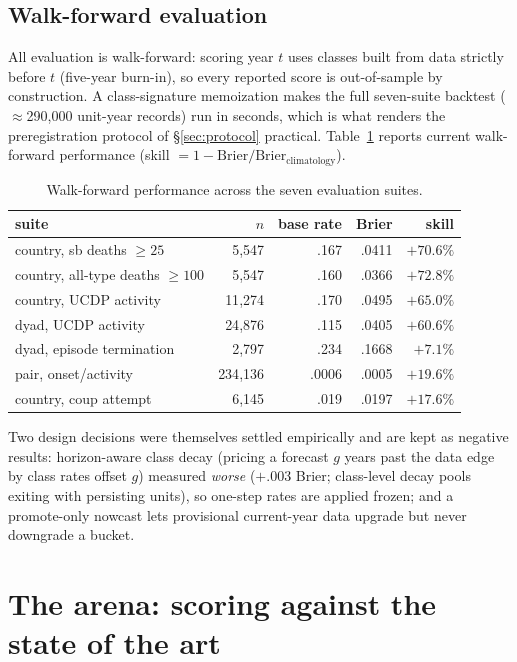\documentclass[11pt]{article}
\newcommand{\brier}{\mathrm{Brier}}
\begin{document}
\subsection{Walk-forward evaluation}

All evaluation is walk-forward: scoring year $t$ uses classes built from
data strictly before $t$ (five-year burn-in), so every reported score is
out-of-sample by construction. A class-signature memoization makes the full
seven-suite backtest ($\approx$290{,}000 unit-year records) run in seconds,
which is what renders the preregistration protocol of \S\ref{sec:protocol}
practical. Table~\ref{tab:backtest} reports current walk-forward performance
(skill $= 1 - \brier/\brier_{\text{climatology}}$).

\begin{table}[t]
\centering
\caption{Walk-forward performance across the seven evaluation suites.}
\label{tab:backtest}
\begin{tabular}{lrrrr}
\toprule
suite & $n$ & base rate & Brier & skill \\
\midrule
country, sb deaths ${\geq}25$        & 5{,}547   & .167  & .0411 & $+70.6\%$ \\
country, all-type deaths ${\geq}100$ & 5{,}547   & .160  & .0366 & $+72.8\%$ \\
country, UCDP activity               & 11{,}274  & .170  & .0495 & $+65.0\%$ \\
dyad, UCDP activity                  & 24{,}876  & .115  & .0405 & $+60.6\%$ \\
dyad, episode termination            & 2{,}797   & .234  & .1668 & $+7.1\%$  \\
pair, onset/activity                 & 234{,}136 & .0006 & .0005 & $+19.6\%$ \\
country, coup attempt                & 6{,}145   & .019  & .0197 & $+17.6\%$ \\
\bottomrule
\end{tabular}
\end{table}

Two design decisions were themselves settled empirically and are kept as
negative results: horizon-aware class decay (pricing a forecast $g$ years
past the data edge by class rates offset $g$) measured \emph{worse}
($+.003$ Brier; class-level decay pools exiting with persisting units), so
one-step rates are applied frozen; and a promote-only nowcast lets
provisional current-year data upgrade but never downgrade a bucket.

\section{The arena: scoring against the state of the art}\label{sec:arena}
\end{document}
